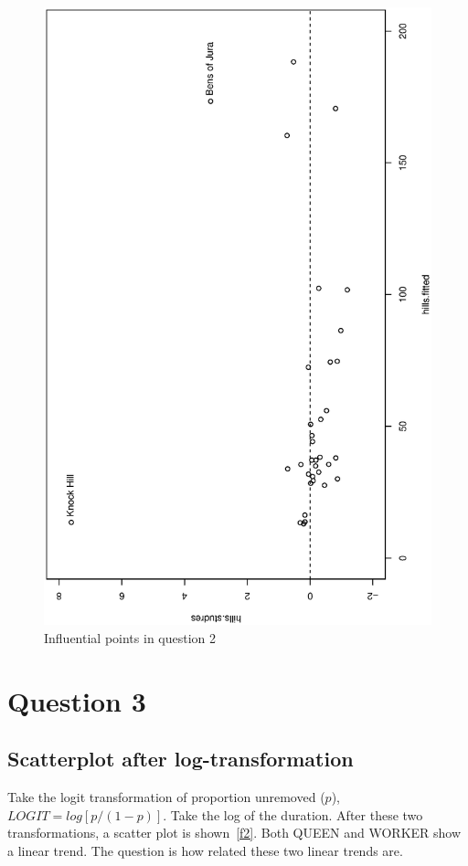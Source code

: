 \documentclass[a4paper,10pt]{article}
\begin{document}
\begin{figure}
\includegraphics[angle=-90, width=1\textwidth]{figures/math650_hw7_fig1.eps}
\caption{Influential points in question 2}\label{f1}
\end{figure}

\section{Question 3}
\subsection{Scatterplot after log-transformation}
Take the logit transformation of proportion unremoved ($p$), $LOGIT=log[p/(1-p)]$. Take the log of the duration. After these two transformations, a scatter plot is shown~\ref{f2}. Both QUEEN and WORKER show a linear trend. The question is how related these two linear trends are. 
\end{document}
